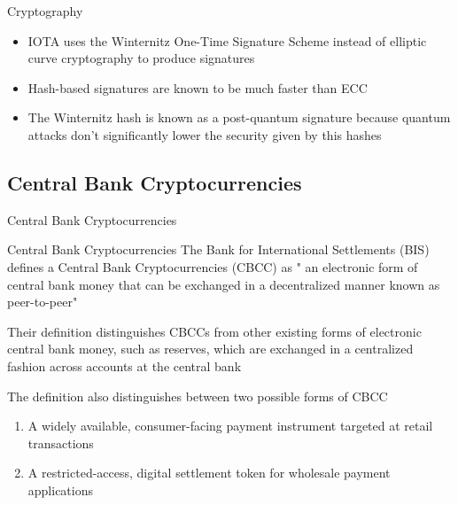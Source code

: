 \documentclass[9pt]{beamer}
\begin{document}
\begin{frame}{Cryptography}
	\begin{itemize}
		\item IOTA uses the Winternitz One-Time Signature Scheme instead of elliptic curve cryptography to produce signatures
		\item Hash-based signatures are known to be much faster than ECC
		\item The Winternitz hash is known as a post-quantum signature because quantum attacks don't significantly lower the security given by this hashes
	\end{itemize}
\end{frame}



\subsection{Central Bank Cryptocurrencies}

\begin{frame}
	\begin{center}
		\begin{large}
			Central Bank Cryptocurrencies
		\end{large}
	\end{center}
\end{frame}



\begin{frame}{Central Bank Cryptocurrencies}
	The Bank for International Settlements (BIS) defines a Central Bank Cryptocurrencies (CBCC) as " an electronic form of central bank money that can be
	exchanged in a decentralized manner known as peer-to-peer" \\ \vspace{3mm}

	Their definition distinguishes CBCCs from other existing forms of electronic central bank money, such as reserves, which are exchanged in a centralized fashion across accounts at the central bank\\ \vspace{3mm}

	The definition also distinguishes between two possible forms of CBCC
	\begin{enumerate}
		\item A widely available, consumer-facing payment instrument targeted at retail transactions
		\item A restricted-access, digital settlement token for wholesale payment applications
	\end{enumerate}
\end{frame}
\end{document}
